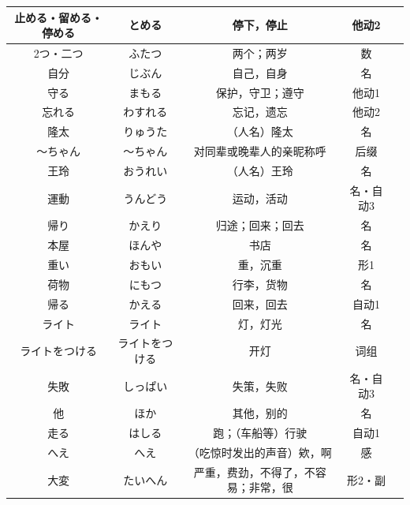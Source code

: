 \begin{longtable}{|c|c|c|c|c|}
止める・留める・停める & とめる & 停下，停止 & 他动2 & \\ \hline
2つ・二つ & ふたつ & 两个；两岁 & 数 & \\ \hline
自分 & じぶん & 自己，自身 & 名 & \\ \hline
守る & まもる & 保护，守卫；遵守 & 他动1 & \\ \hline
忘れる & わすれる & 忘记，遗忘 & 他动2 & \\ \hline
隆太 & りゅうた & （人名）隆太 & 名 & \\ \hline
〜ちゃん & 〜ちゃん & 对同辈或晚辈人的亲昵称呼 & 后缀 & \\ \hline
王玲 & おうれい & （人名）王玲 & 名 & \\ \hline
運動 & うんどう & 运动，活动 & 名・自动3 & \\ \hline
帰り & かえり & 归途；回来；回去 & 名 & \\ \hline
本屋 & ほんや & 书店 & 名 & \\ \hline
重い & おもい & 重，沉重 & 形1 & \\ \hline
荷物 & にもつ & 行李，货物 & 名 & \\ \hline
帰る & かえる & 回来，回去 & 自动1 & \\ \hline
ライト & ライト & 灯，灯光 & 名 & \\ \hline
ライトをつける & ライトをつける & 开灯 & 词组 & \\ \hline
失敗 & しっぱい & 失策，失败 & 名・自动3 & \\ \hline
他 & ほか & 其他，别的 & 名 & \\ \hline
走る & はしる & 跑；（车船等）行驶 & 自动1 & \\ \hline
へえ & へえ & （吃惊时发出的声音）欸，啊 & 感 & \\ \hline
大変 & たいへん & 严重，费劲，不得了，不容易；非常，很 & 形2・副 & \\ \hline
\end{longtable}


